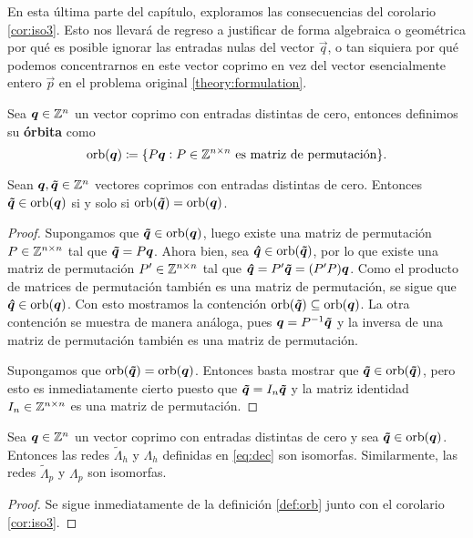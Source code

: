 En esta última parte del capítulo, exploramos las consecuencias del corolario \ref{cor:iso3}. Esto
nos llevará de regreso a justificar de forma algebraica o geométrica por qué es posible ignorar las
entradas nulas del vector $\vec{q}$, o tan siquiera por qué podemos concentrarnos en este vector
coprimo en vez del vector esencialmente entero $\vec{p}$ en el problema original
\eqref{theory:formulation}.
\begin{definition}
	\label{def:orb}
	Sea $\boldsymbol{q} \in \mathbb{Z}^n$ un vector coprimo con entradas distintas de cero, entonces
	definimos su \textbf{órbita} como
	\begin{equation*}
		\operatorname{orb}(\boldsymbol{q}) \coloneq \lbrace P\boldsymbol{q} \vcentcolon P \in \mathbb{Z}^{n\times n} ~\text{es matriz de
		permutación} \rbrace.
	\end{equation*}
\end{definition}
\begin{lemma}
	\label{lemma:orb}
	Sean $\boldsymbol{q}, \boldsymbol{\tilde{q}} \in \mathbb{Z}^n$ vectores coprimos con entradas distintas de cero. Entonces
	$\boldsymbol{\tilde{q}} \in \operatorname{orb}(\boldsymbol{q})$ si y solo si $\operatorname{orb}(\boldsymbol{\tilde{q}}) = \operatorname{orb}(\boldsymbol{q})$.
\end{lemma}
\begin{proof}
	Supongamos que $\boldsymbol{\tilde{q}} \in \operatorname{orb}(\boldsymbol{q})$, luego existe una matriz de permutación $P \in \mathbb{Z}^{n\times
	n}$ tal que $\boldsymbol{\tilde{q}} = P\boldsymbol{q}$. Ahora bien, sea $\boldsymbol{\hat{q}} \in \operatorname{orb}(\boldsymbol{\tilde{q}})$, por lo
	que existe una matriz de permutación $P' \in \mathbb{Z}^{n\times n}$ tal que $\boldsymbol{\hat{q}} = P'\boldsymbol{\tilde{q}}
	= (P'P)\boldsymbol{q}$. Como el producto de matrices de permutación también es una matriz de
	permutación, se sigue que $\boldsymbol{\hat{q}} \in \operatorname{orb}(\boldsymbol{q})$. Con esto mostramos la contención
	$\operatorname{orb}(\boldsymbol{\tilde{q}}) \subseteq \operatorname{orb}(\boldsymbol{q})$. La otra contención se muestra de manera análoga, pues
	$\boldsymbol{q} = P^{-1}\boldsymbol{\tilde{q}}$ y la inversa de una matriz de permutación también es una matriz de
	permutación.

	Supongamos que $\operatorname{orb}(\boldsymbol{\tilde{q}}) = \operatorname{orb}(\boldsymbol{q})$. Entonces basta mostrar que $\boldsymbol{\tilde{q}} \in
	\operatorname{orb}(\boldsymbol{\tilde{q}})$, pero esto es inmediatamente cierto puesto que $\boldsymbol{\tilde{q}} = I_n\boldsymbol{\tilde{q}}$ y la
	matriz identidad $I_n \in \mathbb{Z}^{n \times n}$ es una matriz de permutación.
\end{proof}

\begin{lemma}
	\label{lemma:isoclass}
	Sea $\boldsymbol{q} \in \mathbb{Z}^n$ un vector coprimo con entradas distintas de cero y sea $\boldsymbol{\tilde{q}} \in
	\operatorname{orb}(\boldsymbol{q})$. Entonces las redes $\tilde{\Lambda}_h$ y $\Lambda_h$ definidas en \eqref{eq:dec}
	son isomorfas. Similarmente, las redes $\tilde{\Lambda}_p$ y $\Lambda_p$ son isomorfas.
\end{lemma}
\begin{proof}
	Se sigue inmediatamente de la definición \ref{def:orb} junto con el corolario \ref{cor:iso3}.
\end{proof}

